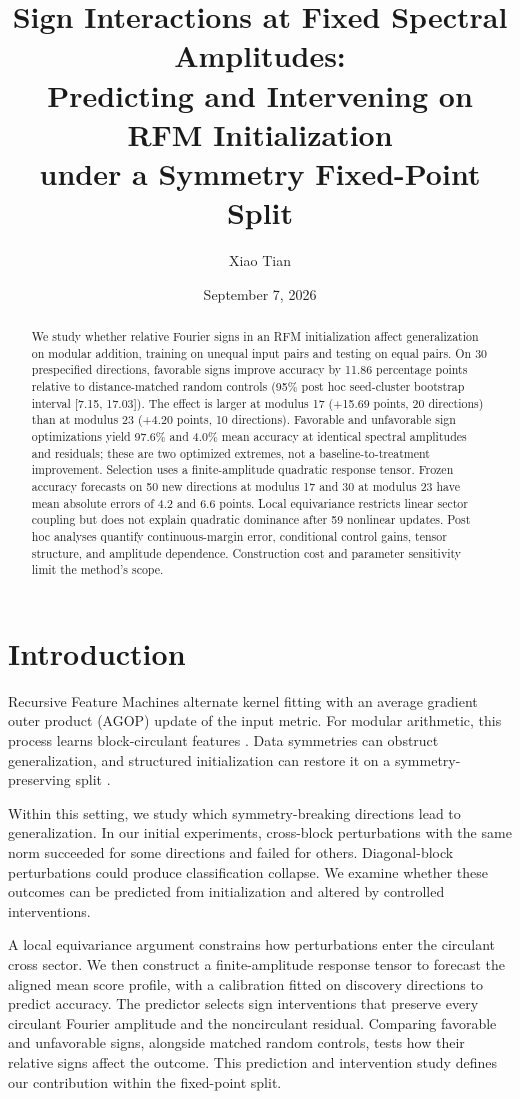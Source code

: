 \documentclass[11pt]{article}
\title{Sign Interactions at Fixed Spectral Amplitudes:\\Predicting and Intervening on RFM Initialization\\under a Symmetry Fixed-Point Split}
\author{Xiao Tian}
\date{September 7, 2026}
\begin{document}
\maketitle
\begin{abstract}
We study whether relative Fourier signs in an RFM initialization affect generalization on modular addition, training on unequal input pairs and testing on equal pairs. On 30 prespecified directions, favorable signs improve accuracy by 11.86 percentage points relative to distance-matched random controls (95\% post hoc seed-cluster bootstrap interval [7.15, 17.03]). The effect is larger at modulus 17 (+15.69 points, 20 directions) than at modulus 23 (+4.20 points, 10 directions). Favorable and unfavorable sign optimizations yield 97.6\% and 4.0\% mean accuracy at identical spectral amplitudes and residuals; these are two optimized extremes, not a baseline-to-treatment improvement. Selection uses a finite-amplitude quadratic response tensor. Frozen accuracy forecasts on 50 new directions at modulus 17 and 30 at modulus 23 have mean absolute errors of 4.2 and 6.6 points. Local equivariance restricts linear sector coupling but does not explain quadratic dominance after 59 nonlinear updates. Post hoc analyses quantify continuous-margin error, conditional control gains, tensor structure, and amplitude dependence. Construction cost and parameter sensitivity limit the method's scope.
\end{abstract}

\section{Introduction}
Recursive Feature Machines alternate kernel fitting with an average gradient outer product (AGOP) update of the input metric. For modular arithmetic, this process learns block-circulant features \citep{mallinar2025}. Data symmetries can obstruct generalization, and structured initialization can restore it on a symmetry-preserving split \citep{bernal2026}.

Within this setting, we study which symmetry-breaking directions lead to generalization. In our initial experiments, cross-block perturbations with the same norm succeeded for some directions and failed for others. Diagonal-block perturbations could produce classification collapse. We examine whether these outcomes can be predicted from initialization and altered by controlled interventions.

A local equivariance argument constrains how perturbations enter the circulant cross sector. We then construct a finite-amplitude response tensor to forecast the aligned mean score profile, with a calibration fitted on discovery directions to predict accuracy. The predictor selects sign interventions that preserve every circulant Fourier amplitude and the noncirculant residual. Comparing favorable and unfavorable signs, alongside matched random controls, tests how their relative signs affect the outcome. This prediction and intervention study defines our contribution within the fixed-point split.
\end{document}
